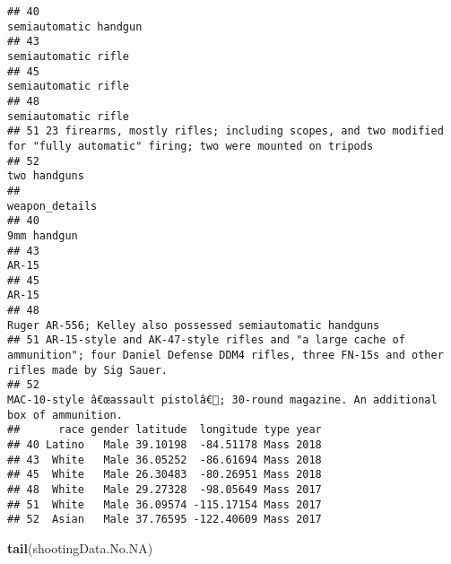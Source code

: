 \documentclass[
]{article}
\newenvironment{Shaded}{\begin{snugshade}}{\end{snugshade}}
\newcommand{\FunctionTok}[1]{\textcolor[rgb]{0.13,0.29,0.53}{\textbf{#1}}}
\newcommand{\NormalTok}[1]{#1}
\begin{document}
\begin{verbatim}
## 40                                                                                                    semiautomatic handgun
## 43                                                                                                      semiautomatic rifle
## 45                                                                                                      semiautomatic rifle
## 48                                                                                                      semiautomatic rifle
## 51 23 firearms, mostly rifles; including scopes, and two modified for "fully automatic" firing; two were mounted on tripods
## 52                                                                                                             two handguns
##                                                                                                                                             weapon_details
## 40                                                                                                                                             9mm handgun
## 43                                                                                                                                                   AR-15
## 45                                                                                                                                                   AR-15
## 48                                                                                              Ruger AR-556; Kelley also possessed semiautomatic handguns
## 51 AR-15-style and AK-47-style rifles and "a large cache of ammunition"; four Daniel Defense DDM4 rifles, three FN-15s and other rifles made by Sig Sauer.
## 52                                                                  MAC-10-style â€œassault pistolâ€; 30-round magazine. An additional box of ammunition.
##      race gender latitude  longitude type year
## 40 Latino   Male 39.10198  -84.51178 Mass 2018
## 43  White   Male 36.05252  -86.61694 Mass 2018
## 45  White   Male 26.30483  -80.26951 Mass 2018
## 48  White   Male 29.27328  -98.05649 Mass 2017
## 51  White   Male 36.09574 -115.17154 Mass 2017
## 52  Asian   Male 37.76595 -122.40609 Mass 2017
\end{verbatim}

\begin{Shaded}
\begin{Highlighting}[]
\FunctionTok{tail}\NormalTok{(shootingData.No.NA)}
\end{Highlighting}
\end{Shaded}
\end{document}
